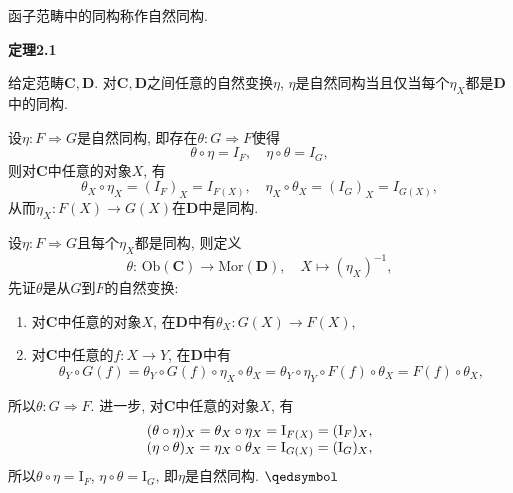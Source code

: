 \documentclass[UTF8]{ctexart}
\begin{document}

\vspace{10pt}

函子范畴中的同构称作自然同构.

\vspace{10pt}

\hypertarget{sec:定理2.1}{}
\noindent\textbf{定理2.1}

给定范畴$\mathbf{C},\mathbf{D}$. 对$\mathbf{C},\mathbf{D}$之间任意的自然变换$\eta$,
$\eta$是自然同构当且仅当每个$\eta_X$都是$\mathbf{D}$中的同构.



设$\eta:F\Rightarrow G$是自然同构, 即存在$\theta:G\Rightarrow F$使得
\[
    \theta\circ\eta=I_F,\quad\eta\circ\theta=I_G,
\]
则对$\mathbf{C}$中任意的对象$X$, 有
\[
    \theta_X\circ\eta_X=(I_F)_X=I_{F(X)},\quad\eta_X\circ\theta_X=(I_G)_X=I_{G(X)},
\]
从而$\eta_X:F(X)\to G(X)$在$\mathbf{D}$中是同构.


设$\eta:F\Rightarrow G$且每个$\eta_X$都是同构, 则定义
\[
    \theta:\,\mathrm{Ob}(\mathbf{C})\to\mathrm{Mor}(\mathbf{D}),\quad
    X\mapsto(\eta_X)^{-1},
\]
先证$\theta$是从$G$到$F$的自然变换:
\begin{enumerate}
    \item 对$\mathbf{C}$中任意的对象$X$, 在$\mathbf{D}$中有$\theta_X:G(X)\to F(X)$,
    \item 对$\mathbf{C}$中任意的$f:X\to Y$, 在$\mathbf{D}$中有
    \[
        \theta_Y\circ G(f)=\theta_Y\circ G(f)\circ\eta_X\circ\theta_X=
        \theta_Y\circ\eta_Y\circ F(f)\circ\theta_X=F(f)\circ\theta_X,
    \]
\end{enumerate}
所以$\theta:G\Rightarrow F$. 进一步, 对$\mathbf{C}$中任意的对象$X$, 有
\vspace{3pt}
\[\begin{aligned}
    (\theta\circ\eta)_X=\theta_X\circ\eta_X=\mathrm{I}_{F(X)}
    =(\mathrm{I}_F)_X,\\[-3pt]
    (\eta\circ\theta)_X=\eta_X\circ\theta_X=\mathrm{I}_{G(X)}
    =(\mathrm{I}_G)_X,
\end{aligned}\vspace{3pt}\]
所以$\theta\circ\eta=\mathrm{I}_F,\,\eta\circ\theta=\mathrm{I}_G$,
即$\eta$是自然同构. \hfill $\qedsymbol$

\end{document}
